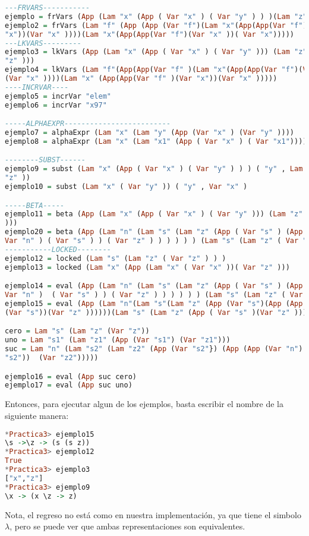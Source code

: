 \documentclass{article}
\begin{document}
\begin{lstlisting}[language=Haskell]
---FRVARS-----------
ejemplo = frVars (App (Lam "x" (App ( Var "x" ) ( Var "y" ) ) )(Lam "z" ( Var "z" ) ) )
ejemplo2 = frVars (Lam "f" (App (App (Var "f")(Lam "x"(App(App(Var "f")(Var
"x"))(Var "x" ))))(Lam "x"(App(App(Var "f")(Var "x" ))( Var "x")))))
---LKVARS---------
ejemplo3 = lkVars (App (Lam "x" (App ( Var "x" ) ( Var "y" ))) (Lam "z" ( Var
"z" )))
ejemplo4 = lkVars (Lam "f"(App(App(Var "f" )(Lam "x"(App(App(Var "f")(Var "x" ))
(Var "x" ))))(Lam "x" (App(App(Var "f" )(Var "x"))(Var "x" )))))
----INCRVAR----
ejemplo5 = incrVar "elem"
ejemplo6 = incrVar "x97"

-----ALPHAEXPR-------------------------
ejemplo7 = alphaExpr (Lam "x" (Lam "y" (App (Var "x" ) (Var "y" ))))
ejemplo8 = alphaExpr (Lam "x" (Lam "x1" (App ( Var "x" ) ( Var "x1"))))

--------SUBST------
ejemplo9 = subst (Lam "x" (App ( Var "x" ) ( Var "y" ) ) ) ( "y" , Lam "z" ( Var
"z" ))
ejemplo10 = subst (Lam "x" ( Var "y" )) ( "y" , Var "x" )

-----BETA-----
ejemplo11 = beta (App (Lam "x" (App ( Var "x" ) ( Var "y" ))) (Lam "z" ( Var "z"
)))
ejemplo20 = beta (App (Lam "n" (Lam "s" (Lam "z" (App ( Var "s" ) (App (App (
Var "n" ) ( Var "s" ) ) ( Var "z" ) ) ) ) ) ) (Lam "s" (Lam "z" ( Var "z" ) ) ) )
-----------LOCKED--------
ejemplo12 = locked (Lam "s" (Lam "z" ( Var "z" ) ) )
ejemplo13 = locked (Lam "x" (App (Lam "x" ( Var "x" ))( Var "z" )))

ejemplo14 = eval (App (Lam "n" (Lam "s" (Lam "z" (App ( Var "s" ) (App (App (
Var "n" )  ( Var "s" ) ) ( Var "z" ) ) ) ) ) ) (Lam "s" (Lam "z" ( Var "z" ) ) ) )
ejemplo15 = eval (App (Lam "n"(Lam "s"(Lam "z" (App (Var "s")(App (App (Var "n")
(Var "s"))(Var "z" ))))))(Lam "s" (Lam "z" (App ( Var "s" )(Var "z" )))))

cero = Lam "s" (Lam "z" (Var "z"))
uno = Lam "s1" (Lam "z1" (App (Var "s1") (Var "z1")))
suc = Lam "n" (Lam "s2" (Lam "z2" (App (Var "s2"}) (App (App (Var "n") (Var
"s2"))  (Var "z2")))))

ejemplo16 = eval (App suc cero)
ejemplo17 = eval (App suc uno)
\end{lstlisting}
Entonces, para ejecutar algun de los ejemplos, basta escribir el nombre de la siguiente manera:
\begin{lstlisting}[language=Haskell]
*Practica3> ejemplo15
\s ->\z -> (s (s z))
*Practica3> ejemplo12
True
*Practica3> ejemplo3
["x","z"]
*Practica3> ejemplo9
\x -> (x \z -> z)
\end{lstlisting}
Nota, el regreso no está como en nuestra implementación, ya que tiene el simbolo
$\lambda$, pero se puede ver que ambas representaciones son equivalentes.
\end{document}
